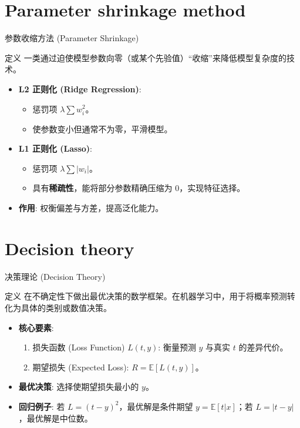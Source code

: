 \documentclass[12pt, aspectratio=169]{beamer}
\newcommand{\E}{\mathbb{E}}
\begin{document}
\section{Parameter shrinkage method}
\begin{frame}{参数收缩方法 (Parameter Shrinkage)}
    \begin{block}{定义}
        一类通过迫使模型参数向零（或某个先验值）“收缩”来降低模型复杂度的技术。
    \end{block}
    
    \vspace{0.5cm}
    \begin{itemize}
        \item \textbf{L2 正则化 (Ridge Regression)}:
        \begin{itemize}
            \item 惩罚项 $\lambda \sum w_i^2$。
            \item 使参数变小但通常不为零，平滑模型。
        \end{itemize}
        \item \textbf{L1 正则化 (Lasso)}:
        \begin{itemize}
            \item 惩罚项 $\lambda \sum |w_i|$。
            \item 具有\textbf{稀疏性}，能将部分参数精确压缩为 0，实现特征选择。
        \end{itemize}
        \item \textbf{作用}: 权衡偏差与方差，提高泛化能力。
    \end{itemize}
\end{frame}

\section{Decision theory}
\begin{frame}{决策理论 (Decision Theory)}
    \begin{block}{定义}
        在不确定性下做出最优决策的数学框架。在机器学习中，用于将概率预测转化为具体的类别或数值决策。
    \end{block}
    
    \vspace{0.5cm}
    \begin{itemize}
        \item \textbf{核心要素}:
        \begin{enumerate}
            \item 损失函数 (Loss Function) $L(t, y)$: 衡量预测 $y$ 与真实 $t$ 的差异代价。
            \item 期望损失 (Expected Loss): $R = \E[L(t, y)]$。
        \end{enumerate}
        \item \textbf{最优决策}: 选择使期望损失最小的 $y$。
        \item \textbf{回归例子}: 若 $L=(t-y)^2$，最优解是条件期望 $y=\E[t|x]$；若 $L=|t-y|$，最优解是中位数。
    \end{itemize}
\end{frame}
\end{document}
